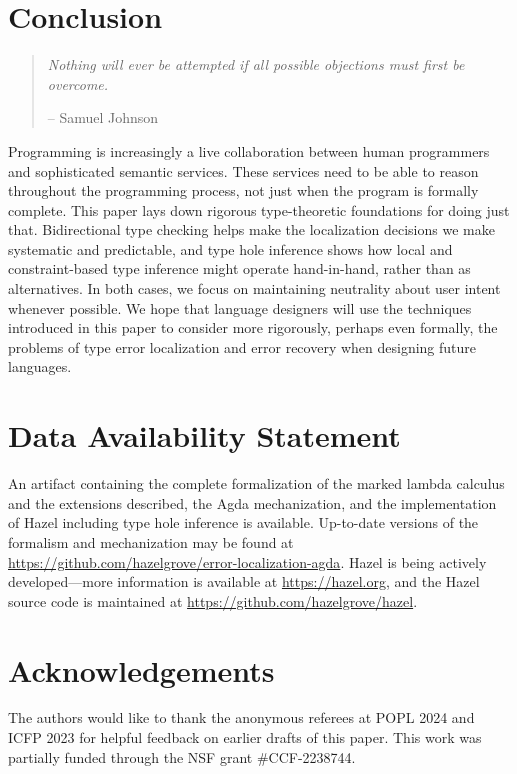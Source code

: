 \section{Conclusion}
\label{sec:conclusion}

\begin{quote}
    \emph{Nothing will ever be attempted if all possible objections must first be overcome.} 
    \begin{flushright}-- Samuel Johnson\end{flushright}
\end{quote}

Programming is increasingly a live collaboration between human programmers and sophisticated semantic services. These services need to be able to reason throughout the programming process, not just when the program is formally complete. This paper lays down rigorous type-theoretic foundations for doing just that. Bidirectional type checking helps make the localization decisions we make systematic and predictable, and type hole inference shows how local and constraint-based type inference might operate hand-in-hand, rather than as alternatives. In both cases, we focus on maintaining neutrality about user intent whenever possible. 
We hope that language designers will use the techniques introduced in this paper to consider more rigorously, perhaps even formally, the problems of type error localization and error recovery when designing future languages. 

\section*{Data Availability Statement}
An artifact \cite{zhao2023} containing the complete formalization of the marked lambda calculus and the extensions described, the Agda mechanization, and the implementation of Hazel including type hole inference is available.
Up-to-date versions of the formalism and mechanization may be found at \url{https://github.com/hazelgrove/error-localization-agda}.
Hazel is being actively developed---more information is available at \url{https://hazel.org}, and the Hazel source code is maintained at \url{https://github.com/hazelgrove/hazel}.

\section*{Acknowledgements}
The authors would like to thank the anonymous referees at POPL 2024 and ICFP 2023 for helpful feedback on earlier drafts of this paper.
This work was partially funded through the NSF grant \#CCF-2238744.

